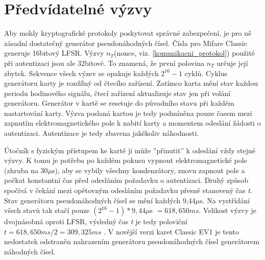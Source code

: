\section{Předvídatelné výzvy}
\label{predvidatelne_nonce}
Aby mohly kryptografické protokoly poskytovat správné zabezpečení, je pro ně zásadní dostatečný generátor pseudonáhodných čísel. Čísla pro Mifare Classic generuje 16bitový LFSR. Výzvy $n_T$(nonce, viz. \ref{komunikacni_protokol}) použité při autentizaci jsou ale 32bitové. To znamená, že první polovina $n_T$ určuje její zbytek. Sekvence všech výzev se opakuje každých $2^{16} - 1$ cyklů\cite{Cryptanalisis}. Cyklus generátoru karty je rozdílný od čtecího zařízení. Zatímco karta mění stav každou periodu hodinového signálu, čtecí zařízení aktualizuje stav jen při volání generátoru\cite{Dismantling_Mifare_Classic}. Generátor v kartě se resetuje do původního stavu při každém nastartování karty. Výzva poslaná kartou je tedy podmíněna pouze časem mezi zapnutím elektromagnetického pole k nabití karty a momentem odeslání žádosti o autentizaci. Autentizace je tedy zbavena jakékoliv náhodnosti. \par
Útočník s fyzickým přístupem ke kartě ji může ''přinutit'' k odeslání vždy stejné výzvy. K tomu je potřeba po každém pokusu vypnout elektromagnetické pole (zhruba na 30$\mu$s), aby se vybily všechny kondenzátory, znovu zapnout pole a počkat konstantní čas před odesláním požadavku o autentizaci. Druhý způsob spočívá v čekání mezi opětovným odesláním požadavku přesně stanovený čas \emph{t}. Stav generátoru pseudonáhodných čísel se mění každých 9,44$\mu$s. Na vystřídání všech stavů tak stačí pouze $(2^{16} - 1) * 9,44\mu$s $= 618,650ms$. Velikost výzvy je dvojnásobná oproti LFSR, výsledný čas \emph{t} je tedy poloviční $t = 618,650ms/2 = 309,325ms$ \cite{Wirelessly_Pickpocketing}. V novější verzi karet Classic EV1 je tento nedostatek odstraněn nahrazením generátoru pseudonáhodných čísel generátorem náhodných čísel\cite{Mifare_Classic_Official_about}.

